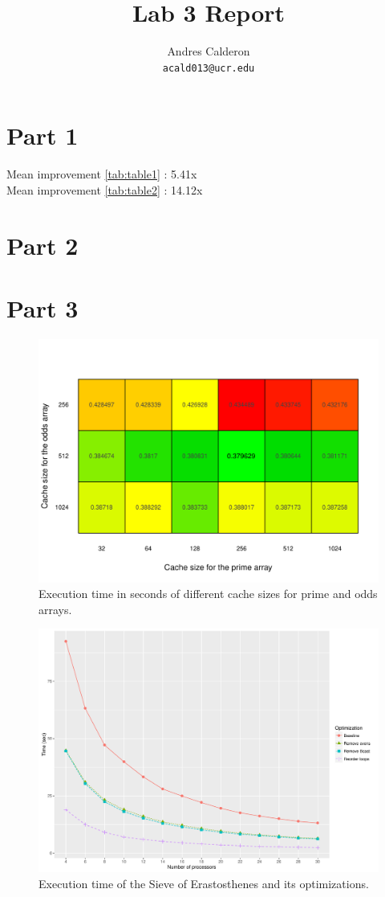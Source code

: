 \documentclass[10pt]{scrartcl}
\title{Lab 3 Report}
\author{
   Andres Calderon\\
  \small \texttt{acald013@ucr.edu}
}
\begin{document}
\maketitle

\section{Part 1}
Mean improvement \ref{tab:table1} : 5.41x \\
Mean improvement \ref{tab:table2} : 14.12x
\section{Part 2}



\section{Part 3}

\begin{figure}
  \centering
  \includegraphics[width=\textwidth]{cache}
  \caption{Execution time in seconds of different cache sizes for prime and odds arrays.}\label{fig:cache}
\end{figure}

\begin{figure}
  \centering
  \includegraphics[width=\textwidth]{plot}
  \caption{Execution time of the Sieve of Erastosthenes and its optimizations.}\label{fig:plot}
\end{figure}
\end{document}
